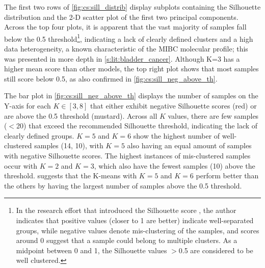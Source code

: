 The first two rows of \cref{fig:cs:sill_distrib} display subplots containing the Silhouette distribution and the 2-D scatter plot of the first two principal components. Across the top four plots, it is apparent that the vast majority of samples fall below the 0.5 threshold\footnote{In the research effort that introduced the Silhouette score \citep{Rousseeuw1987-wy}, the author indicates that positive values (closer to 1 are better) indicate well-separated groups, while negative values denote mis-clustering of the samples, and scores around 0 suggest that a sample could belong to multiple clusters. As a midpoint between 0 and 1, the Silhouette values $>$0.5 are considered to be well clustered.}, indicating a lack of clearly defined clusters and a high data heterogeneity, a known characteristic of the MIBC molecular profile; this was presented in more depth in \cref{s:lit:bladder_cancer}. Although K=3 has a higher mean score than other models, the top right plot shows that most samples still score below 0.5, as also confirmed in \cref{fig:cs:sill_neg_above_th}.


The bar plot in \cref{fig:cs:sill_neg_above_th} displays the number of samples on the Y-axis for each $K \in [3, 8]$ that either exhibit negative Silhouette scores (red) or are above the 0.5 threshold (mustard). Across all $K$ values, there are few samples ($<$20) that exceed the recommended Silhouette threshold, indicating the lack of clearly defined groups. $K=5$ and $K=6$ show the highest number of well-clustered samples (14, 10), with $K=5$ also having an equal amount of samples with negative Silhouette scores. The highest instances of mis-clustered samples occur with $K=2$ and $K=3$, which also have the fewest samples (10) above the threshold.  suggests that the K-means with $K=5$ and $K=6$ perform better than the others by having the largest number of samples above the 0.5 threshold.


